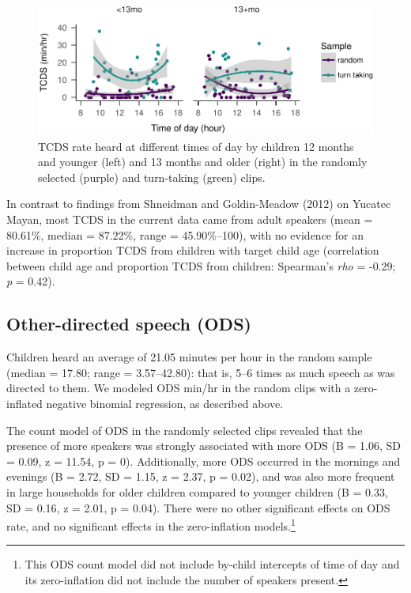 \documentclass[floatsintext,man]{apa6}
\theoremstyle{definition}
\theoremstyle{definition}
\theoremstyle{definition}
\theoremstyle{remark}
\begin{document}
\begin{figure}
\centering
\includegraphics{Tseltal-CLE_files/figure-latex/fig4-1.pdf}
\caption{\label{fig:fig4}TCDS rate heard at different times of day by
children 12 months and younger (left) and 13 months and older (right) in
the randomly selected (purple) and turn-taking (green) clips.}
\end{figure}

In contrast to findings from Shneidman and Goldin-Meadow (2012) on
Yucatec Mayan, most TCDS in the current data came from adult speakers
(mean = 80.61\%, median = 87.22\%, range = 45.90\%--100), with no
evidence for an increase in proportion TCDS from children with target
child age (correlation between child age and proportion TCDS from
children: Spearman's \emph{rho} = -0.29; \emph{p} = 0.42).

\subsection{Other-directed speech
(ODS)}\label{other-directed-speech-ods}

Children heard an average of 21.05 minutes per hour in the random sample
(median = 17.80; range = 3.57--42.80): that is, 5--6 times as much
speech as was directed to them. We modeled ODS min/hr in the random
clips with a zero-inflated negative binomial regression, as described
above.

The count model of ODS in the randomly selected clips revealed that the
presence of more speakers was strongly associated with more ODS (B =
1.06, SD = 0.09, z = 11.54, p = 0). Additionally, more ODS occurred in
the mornings and evenings (B = 2.72, SD = 1.15, z = 2.37, p = 0.02), and
was also more frequent in large households for older children compared
to younger children (B = 0.33, SD = 0.16, z = 2.01, p = 0.04). There
were no other significant effects on ODS rate, and no significant
effects in the zero-inflation models.\footnote{This ODS count model did
  not include by-child intercepts of time of day and its zero-inflation
  did not include the number of speakers present.}
\end{document}
